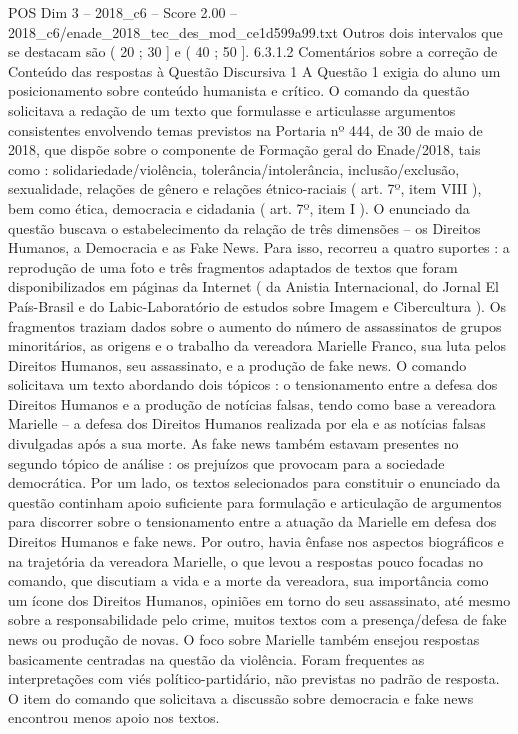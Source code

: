 \begin{textsample}{POS Dim 3 – 2018\_c6 – Score 2.00 – 2018\_c6/enade\_2018\_tec\_des\_mod\_ce1d599a99.txt}
Outros dois intervalos que se destacam são ( 20 ; 30 ] e ( 40 ; 50 ]. 6.3.1.2 Comentários sobre a correção de Conteúdo das respostas à Questão Discursiva 1 A Questão 1 exigia do aluno um posicionamento sobre conteúdo humanista e crítico.
O comando da questão solicitava a redação de um texto que formulasse e articulasse argumentos consistentes envolvendo temas previstos na Portaria nº 444, de 30 de maio de 2018, que dispõe sobre o componente de Formação geral do Enade/2018, tais como : solidariedade/violência, tolerância/intolerância, inclusão/exclusão, sexualidade, relações de gênero e relações étnico-raciais ( art. 7º, item VIII ), bem como ética, democracia e cidadania ( art. 7º, item I ).
O enunciado da questão buscava o estabelecimento da relação de três dimensões – os Direitos Humanos, a Democracia e as Fake News.
Para isso, recorreu a quatro suportes : a reprodução de uma foto e três fragmentos adaptados de textos que foram disponibilizados em páginas da Internet ( da Anistia Internacional, do Jornal El País-Brasil e do Labic-Laboratório de estudos sobre Imagem e Cibercultura ).
Os fragmentos traziam dados sobre o aumento do número de assassinatos de grupos minoritários, as origens e o trabalho da vereadora Marielle Franco, sua luta pelos Direitos Humanos, seu assassinato, e a produção de fake news.
O comando solicitava um texto abordando dois tópicos : o tensionamento entre a defesa dos Direitos Humanos e a produção de notícias falsas, tendo como base a vereadora Marielle – a defesa dos Direitos Humanos realizada por ela e as notícias falsas divulgadas após a sua morte.
As fake news também estavam presentes no segundo tópico de análise : os prejuízos que provocam para a sociedade democrática.
Por um lado, os textos selecionados para constituir o enunciado da questão continham apoio suficiente para formulação e articulação de argumentos para discorrer sobre o tensionamento entre a atuação da Marielle em defesa dos Direitos Humanos e fake news.
Por outro, havia ênfase nos aspectos biográficos e na trajetória da vereadora Marielle, o que levou a respostas pouco focadas no comando, que discutiam a vida e a morte da vereadora, sua importância como um ícone dos Direitos Humanos, opiniões em torno do seu assassinato, até mesmo sobre a responsabilidade pelo crime, muitos textos com a presença/defesa de fake news ou produção de novas.
O foco sobre Marielle também ensejou respostas basicamente centradas na questão da violência.
Foram frequentes as interpretações com viés político-partidário, não previstas no padrão de resposta.
O item do comando que solicitava a discussão sobre democracia e fake news encontrou menos apoio nos textos.

\end{textsample}
